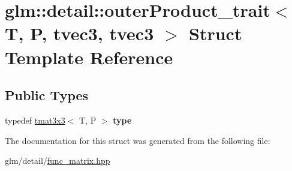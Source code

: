 \hypertarget{structglm_1_1detail_1_1outerProduct__trait_3_01T_00_01P_00_01tvec3_00_01tvec3_01_4}{\section{glm\-:\-:detail\-:\-:outer\-Product\-\_\-trait$<$ T, P, tvec3, tvec3 $>$ Struct Template Reference}
\label{structglm_1_1detail_1_1outerProduct__trait_3_01T_00_01P_00_01tvec3_00_01tvec3_01_4}
}
\subsection*{Public Types}
\begin{DoxyCompactItemize}
\item 
\hypertarget{structglm_1_1detail_1_1outerProduct__trait_3_01T_00_01P_00_01tvec3_00_01tvec3_01_4_ac6a4ba81935840a9b4e4603f0bc0e222}{typedef \hyperlink{structglm_1_1tmat3x3}{tmat3x3}$<$ T, P $>$ {\bfseries type}}\label{structglm_1_1detail_1_1outerProduct__trait_3_01T_00_01P_00_01tvec3_00_01tvec3_01_4_ac6a4ba81935840a9b4e4603f0bc0e222}

\end{DoxyCompactItemize}


The documentation for this struct was generated from the following file\-:\begin{DoxyCompactItemize}
\item 
glm/detail/\hyperlink{func__matrix_8hpp}{func\-\_\-matrix.\-hpp}\end{DoxyCompactItemize}
